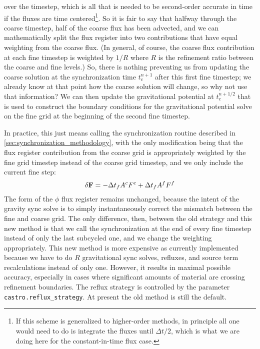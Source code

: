 over the timestep, which is all that is needed to be second-order
accurate in time if the fluxes are time centered\footnote{If this scheme
is generalized to higher-order methods, in principle all one would need
to do is integrate the fluxes until $\Delta t / 2$, which is what we are
doing here for the constant-in-time flux case.}. So it is fair to say
that halfway through the coarse timestep, half of the coarse flux has
been advected, and we can mathematically split the flux register into
two contributions that have equal weighting from the coarse flux. (In
general, of course, the coarse flux contribution at each fine timestep
is weighted by $1/R$ where $R$ is the refinement ratio between the
coarse and fine levels.) So, there is nothing preventing us from
updating the coarse solution at the synchronization time $t^{n+1}_c$
after this first fine timestep; we already know at that point how the
coarse solution will change, so why not use that information? We can
then update the gravitational potential at $t^{n+1/2}_c$ that is used to
construct the boundary conditions for the gravitational potential solve
on the fine grid at the beginning of the second fine timestep.

In practice, this just means calling the synchronization routine
described in \ref{sec:synchronization_methodology}, with the only
modification being that the flux register contribution from the coarse
grid is appropriately weighted by the fine grid timestep instead of
the coarse grid timestep, and we only include the current fine step:
\begin{equation}
\delta{\bf F} = -\Delta t_f A^c F^c + \Delta t_f A^f F^f
\end{equation}
The form of the $\phi$ flux register remains unchanged, because the
intent of the gravity sync solve is to simply instantaneously correct
the mismatch between the fine and coarse grid. The only difference,
then, between the old strategy and this new method is that we call the
synchronization at the end of every fine timestep instead of only the
last subcycled one, and we change the weighting appropriately. This
new method is more expensive as currently implemented because we have
to do $R$ gravitational sync solves, refluxes, and source term
recalculations instead of only one. However, it results in maximal
possible accuracy, especially in cases where significant amounts of
material are crossing refinement boundaries. The reflux strategy is
controlled by the parameter {\tt castro.reflux\_strategy}. At present
the old method is still the default.

